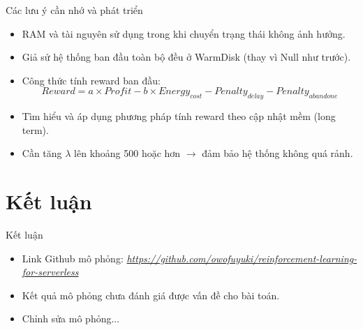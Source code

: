 \documentclass[10pt,aspectratio=169]{beamer}
\begin{document}
\begin{frame}{Các lưu ý cần nhớ và phát triển}
\begin{itemize}
\setlength\itemsep{8pt}
\item RAM và tài nguyên sử dụng trong khi chuyển trạng thái không ảnh hưởng.
\item Giả sử hệ thống ban đầu toàn bộ đều ở WarmDisk (thay vì Null như trước).
\item Công thức tính reward ban đầu:
\begin{equation*}
Reward = a \times Profit - b \times Energy_{cost} - Penalty_{delay} - Penalty_{abandone}
\end{equation*}
\item Tìm hiểu và áp dụng phương pháp tính reward theo cập nhật mềm (long term).
\item Cần tăng $ \lambda $ lên khoảng 500 hoặc hơn $ \rightarrow $ đảm bảo hệ thống không quá rảnh.
\end{itemize}
\end{frame}

\section{Kết luận}

\begin{frame}{Kết luận}
\begin{itemize}
\setlength\itemsep{8pt}
\item Link Github mô phỏng: \textit{
\href{https://github.com/owofuyuki/reinforcement-learning-for-serverless}{https://github.com/owofuyuki/reinforcement-learning-for-serverless}}
\item Kết quả mô phỏng chưa đánh giá được vấn đề cho bài toán.
\item Chỉnh sửa mô phỏng...
\end{itemize}
\end{frame}

\backmatter
\end{document}
